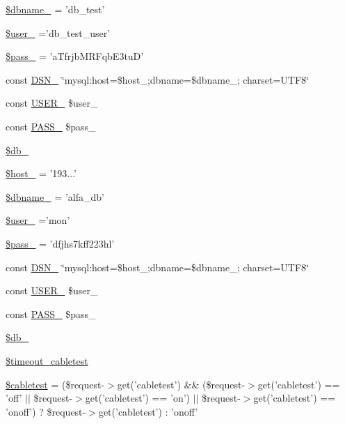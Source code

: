\begin{DoxyCompactItemize}
\item 
\hyperlink{group___d_b__2_gae40cd9ac0cdd9542398e94e75a970c0c}{\$dbname\-\_} = 'db\-\_\-test'
\item 
\hyperlink{group___d_b__2_gaf33b43cdfbb1e0ca41bfd37425fc6bfe}{\$user\-\_} ='db\-\_\-test\-\_\-user'
\item 
\hyperlink{group___d_b__2_gab3a158e940b491fbf53fd8271fb05e45}{\$pass\-\_} = 'a\-Tfrjb\-M\-R\-Fqb\-E3tu\-D'
\item 
const \hyperlink{group___d_b__2_ga72e6fba3d74199ad6e7e817a61e4a14d}{D\-S\-N\-\_} \char`\"{}mysql\-:host=\$host\-\_;dbname=\$dbname\-\_; charset=U\-T\-F8\char`\"{}
\item 
const \hyperlink{group___d_b__2_ga92b63a34ae60895214a8f31ebb5e9b58}{U\-S\-E\-R\-\_} \$user\-\_
\item 
const \hyperlink{group___d_b__2_ga8b3fe80baea61cdf88958113cc16a363}{P\-A\-S\-S\-\_} \$pass\-\_
\item 
\hyperlink{group___d_b__2_ga35a69e2032e40a7d510004071c24c17c}{\$db\-\_}
\item 
\hyperlink{group___d_b__3_ga9782328ab4366de7daff22fe23704413}{\$host\-\_} = '193...'
\item 
\hyperlink{group___d_b__3_ga0def194ad2413b876916149582a2b1e9}{\$dbname\-\_} = 'alfa\-\_\-db'
\item 
\hyperlink{group___d_b__3_ga5f8fd50656344478702668d5de68e802}{\$user\-\_} ='mon'
\item 
\hyperlink{group___d_b__3_gaaa7650887f2a6a859cb6420d9dba37f0}{\$pass\-\_} = 'dfjhs7kff223hl'
\item 
const \hyperlink{group___d_b__3_ga84e111746d69b14479dbf3f99b4e21ad}{D\-S\-N\-\_} \char`\"{}mysql\-:host=\$host\-\_;dbname=\$dbname\-\_; charset=U\-T\-F8\char`\"{}
\item 
const \hyperlink{group___d_b__3_gabb4d4077f995367d73794dcfd8c50a23}{U\-S\-E\-R\-\_} \$user\-\_
\item 
const \hyperlink{group___d_b__3_gad7bf3ef090d7da2ae80f4a5f3ab4e67c}{P\-A\-S\-S\-\_} \$pass\-\_
\item 
\hyperlink{group___d_b__3_ga86a3d1ce31d6a69ea9c6b655a3fb10a1}{\$db\-\_}
\item 
\hyperlink{group__timeout__cabletest_ga4bf51deec9851d3432a7b41ccb07f2c8}{\$timeout\-\_\-cabletest}
\item 
\hyperlink{group__on__off__cabletest_ga8a066b0c14b92b0fce632e27b8dd35c9}{\$cabletest} = (\$request-\/$>$get('cabletest') \&\& (\$request-\/$>$get('cabletest') == 'off' $\vert$$\vert$ \$request-\/$>$get('cabletest') == 'on') $\vert$$\vert$ \$request-\/$>$get('cabletest') == 'onoff') ? \$request-\/$>$get('cabletest') \-: 'onoff'

\end{DoxyCompactItemize}
